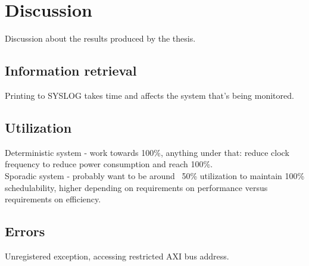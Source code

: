 \chapter{Discussion}
Discussion about the results produced by the thesis.

\section{Information retrieval}
Printing to SYSLOG takes time and affects the system that's being monitored.

\section{Utilization}
Deterministic system - work towards 100\%, anything under that: reduce clock frequency to reduce power consumption and reach 100\%.\\

Sporadic system - probably want to be around ~50\% utilization to maintain 100\% schedulability, higher depending on requirements on performance versus requirements on efficiency.

\section{Errors}
Unregistered exception, accessing restricted AXI bus address.
